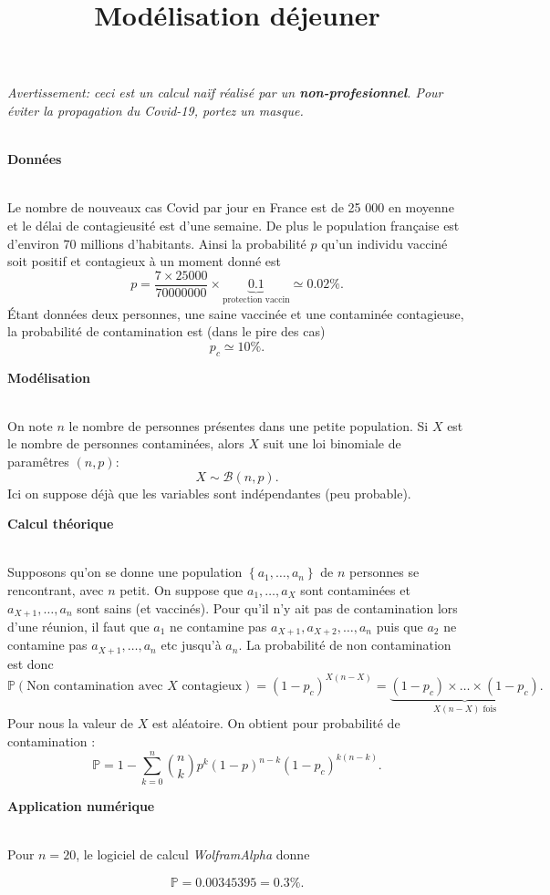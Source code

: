 \documentclass{article}
\theoremstyle{pourrk}
\begin{document}
\title{\textbf{Modélisation déjeuner}}
\date{}
\maketitle
\emph{Avertissement: ceci est un calcul naïf réalisé par un \textbf{non-profesionnel}. Pour éviter la propagation du Covid-19, portez un masque.}\\
~\\


\centerline{\textbf{Données}}
~\\
Le nombre de nouveaux cas Covid par jour en France est de 25 000 en moyenne et le délai de contagieusité est d'une semaine. De plus le population française est d'environ 70 millions d'habitants. Ainsi la probabilité $p$ qu'un individu vacciné soit positif et contagieux à un moment donné est 
$$p = \frac{7\times 25000}{70000000}\times \underbrace{0.1}_{\text{protection vaccin}} \simeq 0.02\%.$$
Étant données deux personnes, une saine vaccinée et une contaminée contagieuse, la probabilité de contamination est (dans le pire des cas) $$p_c\simeq 10\%.$$


\centerline{\textbf{Modélisation}}
~\\
On note $n$ le nombre de personnes présentes dans une petite population. Si $X$ est le nombre de personnes contaminées, alors $X$ suit une loi binomiale de paramêtres $(n,p)$:
$$X\sim \mathcal{B}(n,p).$$
Ici on suppose déjà que les variables sont indépendantes (peu probable). \\

\centerline{\textbf{Calcul théorique}}
~\\
Supposons qu'on se donne une population $\left\lbrace a_1,\dots,a_n\right\rbrace$ de $n$ personnes se rencontrant, avec $n$ petit. On suppose que $a_1,\dots,a_X$ sont contaminées et $a_{X+1},\dots,a_n$ sont sains (et vaccinés). 
Pour qu'il n'y ait pas de contamination lors d'une réunion, il faut que $a_1$ ne contamine pas $a_{X+1},a_{X+2},\dots,a_n$ puis que $a_2$ ne contamine pas $a_{X+1},\dots,a_n$ etc jusqu'à $a_n$. La probabilité de non contamination est donc 
$$\mathbb{P}(\text{Non contamination avec }X\text{ contagieux})=(1-p_c)^{X(n-X)}=\underbrace{(1-p_c)\times \dots \times (1-p_c)}_{X(n-X)\text{ fois}}.$$
Pour nous la valeur de $X$ est aléatoire. On obtient pour probabilité de contamination : 
$$\boxed{\mathbb{P}=1-\sum_{k=0}^n{n\choose k}p^k(1-p)^{n-k}(1-p_c)^{k(n-k)}.}$$

\centerline{\textbf{Application numérique}}
~\\
Pour $n=20$, le logiciel de calcul \emph{WolframAlpha} donne 

$$\boxed{\mathbb{P}=0.00345395=0.3\%.}$$

\end{document}
